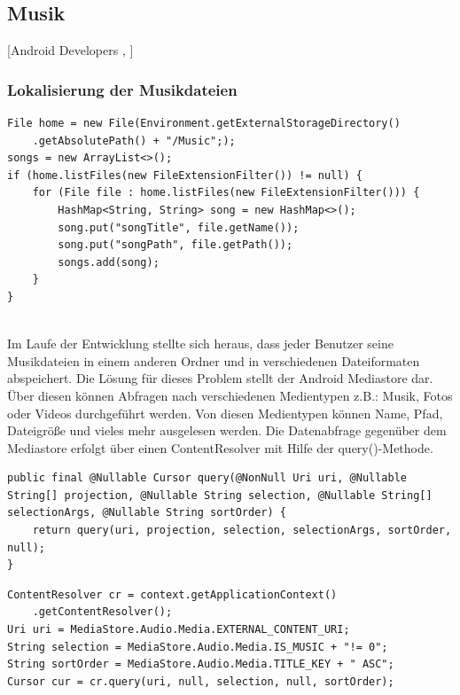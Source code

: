 \documentclass[FIPLY_base.tex]{subfiles}
\begin{document}
\subsection{ Musik}
[Android Developers \cite{adMediaPlayer}, \citeauthor{bMediaPlayer} \cite{bMediaPlayer}]

\subsubsection{ Lokalisierung der Musikdateien}
\begin{lstlisting}[caption={Ursprünglicher Ansatz zum Lesen aller mp3-Files im Music-Ordner},label=DescriptiveLabel]
File home = new File(Environment.getExternalStorageDirectory()
	.getAbsolutePath() + "/Music";);
songs = new ArrayList<>();
if (home.listFiles(new FileExtensionFilter()) != null) {
	for (File file : home.listFiles(new FileExtensionFilter())) {
		HashMap<String, String> song = new HashMap<>();
		song.put("songTitle", file.getName());
		song.put("songPath", file.getPath());
		songs.add(song);
	}
}    
\end{lstlisting}

\ \\
Im Laufe der Entwicklung stellte sich heraus, dass jeder Benutzer seine Musikdateien in einem anderen Ordner und in verschiedenen Dateiformaten abspeichert. 
Die Lösung für dieses Problem stellt der Android Mediastore dar. 
Über diesen können Abfragen nach verschiedenen Medientypen z.B.: Musik, Fotos oder Videos durchgeführt werden. Von diesen Medientypen können Name, Pfad, Dateigröße und vieles mehr ausgelesen werden.
Die Datenabfrage gegenüber dem Mediastore erfolgt über einen ContentResolver mit Hilfe der query()-Methode.
\begin{lstlisting}[caption={Die query-Methode des Android Source Codes in der \citetitle{acContentResolver} Klasse \cite{acContentResolver}},label=DescriptiveLabel]
public final @Nullable Cursor query(@NonNull Uri uri, @Nullable String[] projection, @Nullable String selection, @Nullable String[] selectionArgs, @Nullable String sortOrder) {
	return query(uri, projection, selection, selectionArgs, sortOrder, null);
}
\end{lstlisting}
\begin{lstlisting}[caption={Alle Audiodateien, die Musik beinhalten, werden gesucht.},label=DescriptiveLabel]
ContentResolver cr = context.getApplicationContext()
	.getContentResolver();
Uri uri = MediaStore.Audio.Media.EXTERNAL_CONTENT_URI;
String selection = MediaStore.Audio.Media.IS_MUSIC + "!= 0";
String sortOrder = MediaStore.Audio.Media.TITLE_KEY + " ASC";
Cursor cur = cr.query(uri, null, selection, null, sortOrder);
\end{lstlisting}
\end{document}
